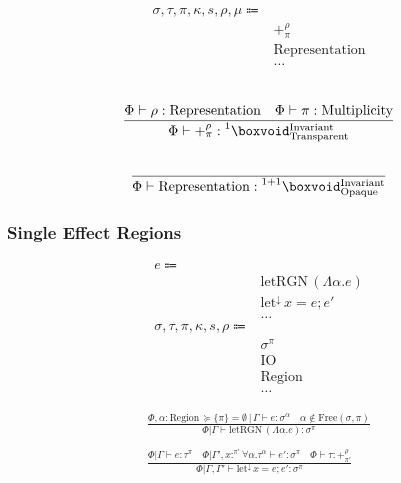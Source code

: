 \documentclass {article}
\begin{document}
\begin{align*}
\sigma, \tau, \pi, \kappa, s, \rho, \mu \Coloneqq & \\
& +^\rho_\pi \tag{Pretype}\\
& \text{Representation} \tag {Representation}\\
& \dots
\end{align*}

\begin{gather*}
\\
\frac
{\Phi \vdash \rho : \text{Representation} \quad \Phi \vdash \pi : \text{Multiplicity}}
{\Phi \vdash +^\rho_\pi : \prescript {1} {} \boxvoid^{\text{Invariant}}_{\text{Transparent}}} \\
\\
\frac
{}
{\Phi \vdash \text{Representation} : \prescript {1 + 1} {} \boxvoid^{\text{Invariant}}_{\text{Opaque}}}
\end{gather*}

\subsubsection{Single Effect Regions}
\begin{align*}
e \Coloneqq & \\
& \text{letRGN} \, (\Lambda \alpha. e) \tag{Create Region} \\
& \text{let}^\downarrow \, x = e; e' \tag{Runtime Let} \\
& \dots \\
\sigma, \tau, \pi, \kappa, s, \rho \Coloneqq & \\
& \sigma^\pi \tag{Region Effect} \\
& \text{IO} \tag{IO Region} \\
& \text{Region} \tag{Region} \\
& \dots
\end{align*}

\begin{gather*}
\frac
{\Phi , \alpha : \text{Region} \, \succeq \{ \pi \} = \emptyset \, | \, \Gamma \vdash e : \sigma^\alpha \quad \alpha \notin \text{Free}(\sigma, \pi)}
{\Phi | \Gamma \vdash \text{letRGN} \, (\Lambda \alpha. e) : \sigma^\pi} \\
\\
\frac
{\Phi | \Gamma \vdash e : \tau^\pi \quad \Phi | \Gamma', x :^{\pi'} \forall \alpha. \tau^\alpha \vdash e' : \sigma^\pi \quad \Phi \vdash \tau : +^{\rho}_{\pi'}}
{\Phi | \Gamma, \Gamma' \vdash \text{let}^\downarrow \, x = e; e' : \sigma^\pi}
\end{gather*}
\end{document}
